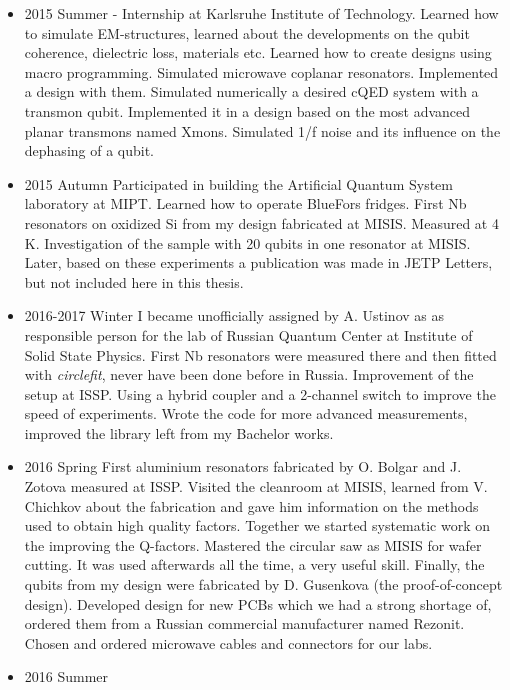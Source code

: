 \documentclass[12pt, twoside]{report}
\numberwithin{equation}{section}
\begin{document}
\begin{itemize}

\item 2015 Summer - Internship at Karlsruhe Institute of Technology.
\subitem Learned how to simulate EM-structures, learned about the developments on the qubit coherence, dielectric loss,  materials etc. Learned how to create designs using macro programming. 
\subitem Simulated microwave coplanar resonators. Implemented a design with them. 
\subitem Simulated numerically a desired cQED system with a transmon qubit. Implemented it in a design based on the most advanced planar transmons named Xmons. 
\subitem Simulated 1/f noise and its influence on the dephasing of a qubit.
\item 2015 Autumn
\subitem Participated in building the Artificial Quantum System laboratory at MIPT. Learned how to operate BlueFors fridges.
\subitem First Nb resonators on oxidized Si from my design fabricated at MISIS. Measured at 4 K.
\subitem Investigation of the sample with 20 qubits in one resonator at MISIS. Later, based on these experiments a publication was made in JETP Letters, but not included here in this thesis.
\item 2016-2017 Winter
\subitem I became unofficially assigned by A. Ustinov as as responsible person for the lab of Russian Quantum Center at Institute of Solid State Physics.
\subitem First Nb resonators were measured there and then fitted with \textit{circlefit}, never have been done before in Russia.
\subitem Improvement of the setup at ISSP. Using a hybrid coupler and a 2-channel switch to improve the speed of experiments.
\subitem Wrote the code for more advanced measurements, improved the library left from my Bachelor works.
\item 2016 Spring
\subitem First aluminium resonators fabricated by O. Bolgar and J. Zotova measured at ISSP.
\subitem Visited the cleanroom at MISIS, learned from V. Chichkov about the fabrication and gave him information on the methods used to obtain high quality factors. Together we started systematic work on the improving the Q-factors.
\subitem Mastered the circular saw as MISIS for wafer cutting. It was used afterwards all the time, a very useful skill.
\subitem Finally, the qubits from my design were fabricated by D. Gusenkova (the proof-of-concept design).
\subitem Developed design for new PCBs which we had a strong shortage of, ordered them from a Russian commercial manufacturer named Rezonit.
\subitem Chosen and ordered microwave cables and connectors for our labs.
\item 2016 Summer

\end{itemize}
\end{document}
